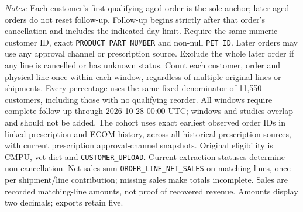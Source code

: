 \begin{table}[!htbp]
\begin{minipage}{\linewidth}
\footnotesize
\textit{Notes:} Each customer's first qualifying aged order is the sole anchor;
later aged orders do not reset follow-up. Follow-up begins strictly after that
order's cancellation and includes the indicated day limit. Require the same
numeric customer ID, exact \texttt{PRODUCT\_PART\_NUMBER} and non-null
\texttt{PET\_ID}. Later orders may use any approval channel or prescription
source. Exclude the whole later order if any line is cancelled or has unknown
status. Count each customer, order and physical line once within each window,
regardless of multiple original lines or shipments. Every percentage uses the
same fixed denominator of 11,550 customers, including those with no
qualifying reorder. All windows require complete follow-up through
2026-10-28 00:00 UTC; windows and studies overlap and should not be added.
The cohort uses exact earliest observed order IDs in linked prescription and
ECOM history, across all historical prescription sources, with current
prescription approval-channel snapshots. Original eligibility is CMPU,
vet diet and \texttt{CUSTOMER\_UPLOAD}. Current extraction statuses determine
non-cancellation. Net sales sum \texttt{ORDER\_LINE\_NET\_SALES} on matching
lines, once per shipment/line contribution; missing sales make totals incomplete.
Sales are recorded matching-line amounts, not proof of recovered revenue.
Amounts display two decimals; exports retain five.
\end{minipage}
\end{table}
